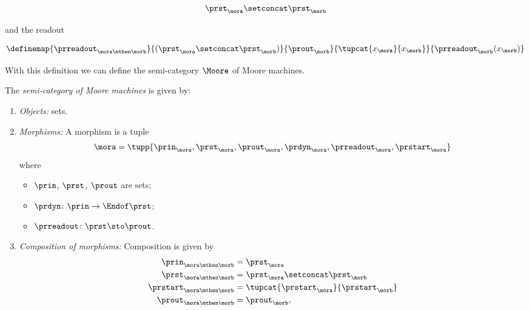 \begin{equation}\label{eq:moore-comp-good-joint}
  \prst_{\mora} \setconcat \prst_{\morb}
\end{equation}

and the readout

\begin{equation}\label{eq:moore-comp-good-3}
  \definemap{
    \prreadout_{\mora\mthen\morb}
    }{
      (\prst_{\mora} \setconcat \prst_{\morb})
    }{
      \prout_{\morb}
    }{
      \tupcat{x_{\mora}}{x_{\morb}}
    }{
      \prreadout_{\morb}(x_{\morb})
    }
\end{equation}


With this definition we can define the semi-category $\Moore$ of Moore machines.

\begin{definition}[\Moore]
  \label{def:Moore}
  The \emph{semi-category of Moore machines} \Moore is given by:
  \begin{enumerate}
    \item \emph{Objects:} sets.
    \item \emph{Morphisms:} A morphism is a tuple
    \begin{equation}
    \mora = \tupp{\prin_{\mora},\prst_{\mora},\prout_{\mora},\prdyn_{\mora},\prreadout_{\mora},\prstart_{\mora}}
    \end{equation}
    where
    \begin{itemize}
      \item $\prin$, $\prst$, $\prout$ are sets;
      \item $  \prdyn \colon \prin \to \Endof \prst$;
      \item $ \prreadout \colon \prst \sto \prout$.
  \end{itemize}
    \item \emph{Composition of morphisms:} Composition is given by
    \begin{equation}
      \begin{aligned}
      \prin_{\mora\mthen\morb} &= \prst_{\mora}   \\
      \prst_{\mora\mthen\morb} &= \prst_{\mora} \setconcat \prst_{\morb} \\
      \prstart_{\mora\mthen\morb} &= \tupcat{\prstart_{\mora}}{\prstart_{\morb}} \\
      \prout_{\mora\mthen\morb} &= \prout_{\morb},
      \end{aligned}
    \end{equation}
% 
    \begin{equation}

\end{equation}
\end{enumerate}
\end{definition}
